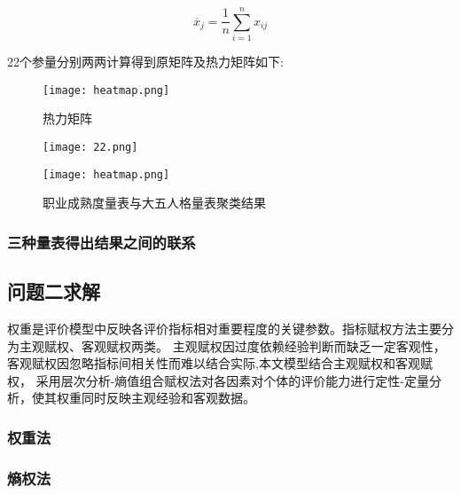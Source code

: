 \documentclass[withoutpreface,bwprint]{cumcmthesis} %
\begin{document}
\begin{equation}
\overline{x}_j = \frac{1}{n} \sum_{i=1}^n x_{ij}
\end{equation}

22个参量分别两两计算得到原矩阵及热力矩阵如下:

\begin{figure}
    \centering
    \begin{minipage}[c]{0.8\textwidth}
        \centering
        \texttt{[image: heatmap.png]}
    \end{minipage}
    \caption{热力矩阵}
\end{figure}

\begin{figure}
    \centering
    \begin{minipage}[c]{0.60\textwidth}
        \centering
        \texttt{[image: 22.png]}
    \end{minipage}
    \begin{minipage}[c]{0.60\textwidth}
        \centering
        \texttt{[image: heatmap.png]}
    \end{minipage}
    \caption{职业成熟度量表与大五人格量表聚类结果}
\end{figure}


\subsubsection{三种量表得出结果之间的联系}






\subsection{问题二求解}


权重是评价模型中反映各评价指标相对重要程度的关键参数。指标赋权方法主要分为主观赋权、客观赋权两类。
主观赋权因过度依赖经验判断而缺乏一定客观性，客观赋权因忽略指标间相关性而难以结合实际,本文模型结合主观赋权和客观赋权，
采用层次分析-熵值组合赋权法对各因素对个体的评价能力进行定性-定量分析，使其权重同时反映主观经验和客观数据。
\subsubsection{权重法}

\subsubsection{熵权法}
\end{document}
